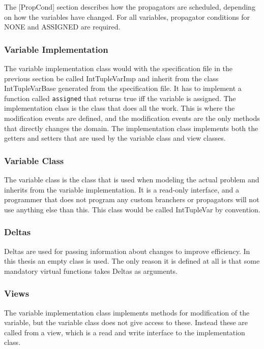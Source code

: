 \documentclass[a4paper,11pt]{article}
\begin{document}
The [PropCond] section describes how the propagators are scheduled, depending on how the variables have changed. For all variables, propagator conditions for NONE and ASSIGNED are required.

\subsubsection{Variable Implementation}
The variable implementation class would with the specification file in the previous section be called IntTupleVarImp and inherit from the class IntTupleVarBase generated from the specification file. It has to implement a function called \texttt{assigned} that returns true iff the variable is assigned. The implementation class is the class that does all the work. This is where the modification events are defined, and the modification events are the only methods that directly changes the domain. The implementation class implements both the getters and setters that are used by the variable class and view classes.

\subsubsection{Variable Class}
The variable class is the class that is used when modeling the actual problem and inherits from the variable implementation. It is a read-only interface, and a programmer that does not program any custom branchers or propagators will not use anything else than this. This class would be called IntTupleVar by convention.

\subsubsection{Deltas}
Deltas are used for passing information about changes to improve efficiency. In this thesis an empty class is used. The only reason it is defined at all is that some mandatory virtual functions takes Deltas as arguments.

\subsubsection{Views}
The variable implementation class implements methods for modification of the variable, but the variable class does not give access to these. Instead these are called from a view, which is a read and write interface to the implementation class.
\end{document}

